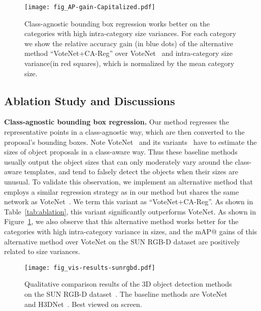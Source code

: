 \documentclass[final]{cvpr}
\begin{document}
\begin{figure}
    \centering
    \texttt{[image: fig\_AP-gain-Capitalized.pdf]}
    \vspace{-2mm}
    \caption{
Class-agnostic bounding box regression works better on the categories with high intra-category size variances. 
For each category we show the relative accuracy gain (in blue dots) of the alternative method ``VoteNet+CA-Reg'' over VoteNet~\cite{votenet} and intra-category size variance(in red squares), which is normalized by the mean category size.
}
    \vspace{-5mm}
    \label{fig:AP_gain}
\end{figure}


\subsection{Ablation Study and Discussions}
\label{subsec:exp-analysis}

\noindent\textbf{Class-agnostic bounding box regression.}
Our method regresses the representative points in a class-agnostic way, which are then converted to the proposal's bounding boxes.
Note VoteNet~\cite{votenet} and its variants~\cite{hgnet,mlcvnet,h3dnet} have to estimate the sizes of object proposals in a class-aware way.
Thus these baseline methods usually output the object sizes that can only moderately vary around the class-aware templates, and tend to falsely detect the objects when their sizes are unusual.
To validate this observation, we implement an alternative method that employs a similar regression strategy as in our method but shares the same network as VoteNet~\cite{votenet}.
We term this variant as ``VoteNet+CA-Reg''.
As shown in Table~\ref{tab:ablation}, this variant significantly outperforms VoteNet.
As shown in Figure~\ref{fig:AP_gain}, we also observe that this alternative method works better for the categories with high intra-category variance in sizes, and the mAP@ gains of this alternative method over VoteNet on the SUN RGB-D dataset are positively related to size variances.

\begin{figure*}
\centering
\texttt{[image: fig\_vis-results-sunrgbd.pdf]}
\caption{
Qualitative comparison results of the 3D object detection methods on the SUN RGB-D dataset~\cite{sunrgb-d}. 
The baseline methods are VoteNet~\cite{votenet} and H3DNet~\cite{h3dnet}. 
Best viewed on screen.
}
\label{fig:vis_results_sunrgbd}
\vspace{-5mm}
\end{figure*}
\end{document}
